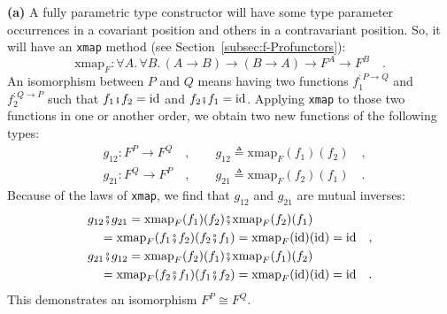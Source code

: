 \textbf{(a)} A fully parametric type constructor will have some type
parameter occurrences in a covariant position and others in a contravariant
position. So, it will have an \lstinline!xmap! method (see Section~\ref{subsec:f-Profunctors}):
\[
\text{xmap}_{F}:\forall A.\,\forall B.\,(A\rightarrow B)\rightarrow(B\rightarrow A)\rightarrow F^{A}\rightarrow F^{B}\quad.
\]
An isomorphism between $P$ and $Q$ means having two functions $f_{1}^{:P\rightarrow Q}$
and $f_{2}^{:Q\rightarrow P}$ such that $f_{1}\bef f_{2}=\text{id}$
and $f_{2}\bef f_{1}=\text{id}$. Applying \lstinline!xmap! to those
two functions in one or another order, we obtain two new functions
of the following types:
\begin{align*}
 & g_{12}:F^{P}\rightarrow F^{Q}\quad,\quad\quad g_{12}\triangleq\text{xmap}_{F}(f_{1})(f_{2})\quad,\\
 & g_{21}:F^{Q}\rightarrow F^{P}\quad,\quad\quad g_{21}\triangleq\text{xmap}_{F}(f_{2})(f_{1})\quad.
\end{align*}
Because of the laws of \lstinline!xmap!, we find that $g_{12}$ and
$g_{21}$ are mutual inverses:
\begin{align*}
 & g_{12}\bef g_{21}=\text{xmap}_{F}(f_{1})(f_{2})\bef\text{xmap}_{F}(f_{2})(f_{1})\\
 & \quad=\text{xmap}_{F}(f_{1}\bef f_{2})(f_{2}\bef f_{1})=\text{xmap}_{F}(\text{id})(\text{id})=\text{id}\quad,\\
 & g_{21}\bef g_{12}=\text{xmap}_{F}(f_{2})(f_{1})\bef\text{xmap}_{F}(f_{1})(f_{2})\\
 & \quad=\text{xmap}_{F}(f_{2}\bef f_{1})(f_{1}\bef f_{2})=\text{xmap}_{F}(\text{id})(\text{id})=\text{id}\quad.
\end{align*}
This demonstrates an isomorphism $F^{P}\cong F^{Q}$.

